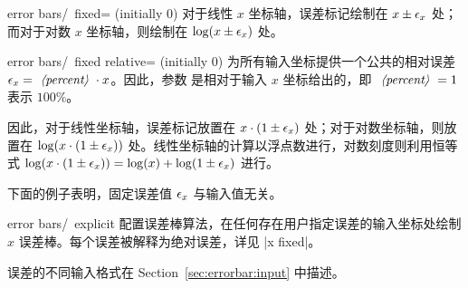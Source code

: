 {\begin{pgfplotsxykey}{error bars/\x\ fixed= (initially 0)}
    对于线性 $x$ 坐标轴，误差标记绘制在 $x \pm \epsilon_{x}$ 处；而对于对数 $x$ 坐标轴，则绘制在 $\log( x \pm \epsilon_{x})$ 处。
\end{pgfplotsxykey}

\begin{pgfplotsxykey}{error bars/\x\ fixed relative= (initially 0)}
    为所有输入坐标提供一个公共的相对误差 $\pgfplotserror x = \text{\meta{percent}} \cdot x$。因此，参数  是相对于输入 $x$ 坐标给出的，即 $\text{\meta{percent}} = 1$ 表示 $100\%$。

    因此，对于线性坐标轴，误差标记放置在 $x \cdot (1 \pm \epsilon_{x})$ 处；对于对数坐标轴，则放置在 $\log(x \cdot (1 \pm \epsilon_{x}))$ 处。线性坐标轴的计算以浮点数进行，对数刻度则利用恒等式 $\log(x \cdot (1 \pm \epsilon_{x})) = \log(x) + \log( 1 \pm \epsilon_{x})$ 进行。

    下面的例子表明，固定误差值 $\epsilon_{x}$ 与输入值无关。
\begin{codeexample}[]
\end{codeexample}
\end{pgfplotsxykey}

\begin{pgfplotsxykey}{error bars/\x\ explicit}
    配置误差棒算法，在任何存在用户指定误差的输入坐标处绘制 $x$ 误差棒。每个误差被解释为绝对误差，详见 |x fixed|。

    误差的不同输入格式在 Section~\ref{sec:errorbar:input} 中描述。
\end{pgfplotsxykey}

}
